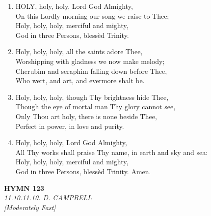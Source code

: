 \begin{enumerate}
    \item HOLY, holy, holy, Lord God Almighty, \\
        On this Lordly morning our song we raise to Thee; \\
        Holy, holy, holy, merciful and mighty, \\
        God in three Persons, bless\`ed Trinity.

    \item Holy, holy, holy, all the saints adore Thee, \\
        Worshipping with gladness we now make melody; \\
        Cherubim and seraphim falling down before Thee, \\
        Who wert, and art, and evermore shalt be.

    \item Holy, holy, holy, though Thy brightness hide Thee, \\
        Though the eye of mortal man Thy glory cannot see, \\
        Only Thou art holy, there is none beside Thee, \\
        Perfect in power, in love and purity.

    \item Holy, holy, holy, Lord God Almighty, \\
        All Thy works shall praise Thy name, in earth and sky and sea: \\
        Holy, holy, holy, merciful and mighty, \\
        God in three Persons, bless\`ed Trinity. Amen.

\end{enumerate}

\newpage
\begin{center}
    {\Large \textbf{HYMN 123\textdagger{}}}
    \\
    \textit{11.10.11.10. D. CAMPBELL}
    \\
    \textit{\small [Moderately Fast]}
\end{center}
\vspace{1em}

